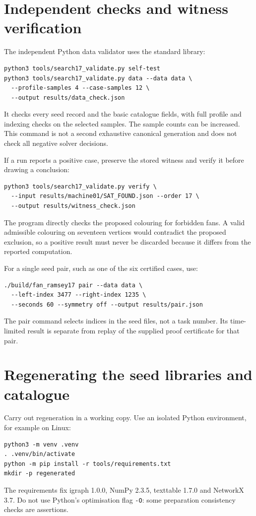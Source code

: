 \documentclass[11pt]{article}
\begin{document}
\section{Independent checks and witness verification}

The independent Python data validator uses the standard library:
\begingroup\footnotesize
\begin{verbatim}
python3 tools/search17_validate.py self-test
python3 tools/search17_validate.py data --data data \
  --profile-samples 4 --case-samples 12 \
  --output results/data_check.json
\end{verbatim}
\endgroup
It checks every seed record and the basic catalogue fields, with full
profile and indexing checks on the selected samples. The sample counts
can be increased. This command is not a second exhaustive canonical
generation and does not check all negative solver decisions.

If a run reports a positive case, preserve the stored witness and
verify it before drawing a conclusion:
\begingroup\footnotesize
\begin{verbatim}
python3 tools/search17_validate.py verify \
  --input results/machine01/SAT_FOUND.json --order 17 \
  --output results/witness_check.json
\end{verbatim}
\endgroup
The program directly checks the proposed colouring for forbidden fans.
A valid admissible colouring on seventeen vertices would contradict
the proposed exclusion, so a positive result must never be discarded
because it differs from the reported computation.

For a single seed pair, such as one of the six certified cases, use:
\begingroup\footnotesize
\begin{verbatim}
./build/fan_ramsey17 pair --data data \
  --left-index 3477 --right-index 1235 \
  --seconds 60 --symmetry off --output results/pair.json
\end{verbatim}
\endgroup
The pair command selects indices in the seed files, not a task number.
Its time-limited result is separate from replay of the supplied proof
certificate for that pair.

\section{Regenerating the seed libraries and catalogue}
\label{sec:regenerate}

Carry out regeneration in a working copy. Use an isolated Python
environment, for example on Linux:
\begingroup\footnotesize
\begin{verbatim}
python3 -m venv .venv
. .venv/bin/activate
python -m pip install -r tools/requirements.txt
mkdir -p regenerated
\end{verbatim}
\endgroup
The requirements fix igraph 1.0.0, NumPy 2.3.5, texttable 1.7.0 and
NetworkX 3.7. Do not use
Python's optimisation flag \texttt{-O}: some preparation consistency
checks are assertions.
\end{document}
